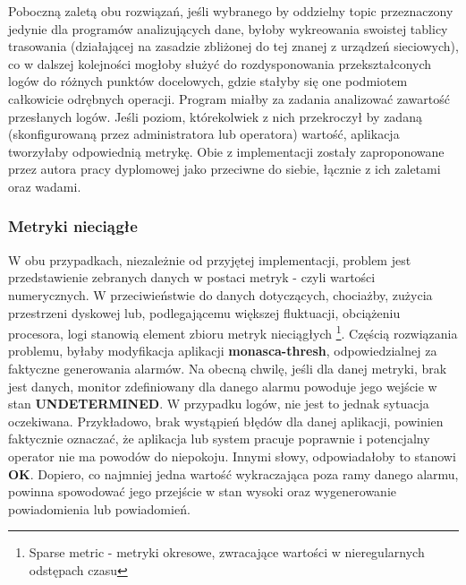     Poboczną zaletą obu rozwiązań, jeśli wybranego by oddzielny topic przeznaczony jedynie dla programów analizujących dane, byłoby wykreowania
    swoistej tablicy trasowania (działającej na zasadzie zbliżonej do tej znanej z urządzeń sieciowych), co w dalszej kolejności mogłoby
    służyć do rozdysponowania przekształconych logów do różnych punktów docelowych, gdzie stałyby się one podmiotem całkowicie odrębnych operacji.
    Program miałby za zadania analizować zawartość przesłanych logów. Jeśli poziom, którekolwiek z nich przekroczył by zadaną (skonfigurowaną przez
    administratora lub operatora) wartość, aplikacja tworzyłaby odpowiednią metrykę.
    Obie z implementacji zostały zaproponowane przez autora pracy dyplomowej jako przeciwne do siebie, łącznie z ich zaletami oraz wadami.

    \subsubsection{Metryki nieciągłe}
    W obu przypadkach, niezależnie od przyjętej implementacji, problem jest przedstawienie zebranych danych w postaci metryk - czyli wartości
    numerycznych. W przeciwieństwie do danych dotyczących, chociażby, zużycia przestrzeni dyskowej lub, podlegającemu większej
    fluktuacji, obciążeniu procesora, logi stanowią element zbioru metryk nieciągłych \footnote{Sparse metric - metryki okresowe,
    zwracające wartości w nieregularnych odstępach czasu}. Częścią rozwiązania problemu, byłaby modyfikacja aplikacji \textbf{monasca-thresh},
    odpowiedzialnej za faktyczne generowania alarmów. Na obecną chwilę, jeśli dla danej metryki, brak jest danych, monitor zdefiniowany
    dla danego alarmu powoduje jego wejście w stan \textbf{UNDETERMINED}. W przypadku logów, nie jest to jednak sytuacja oczekiwana. 
    Przykładowo, brak wystąpień błędów dla danej aplikacji, powinien faktycznie oznaczać, że aplikacja lub system pracuje poprawnie i
    potencjalny operator nie ma powodów do niepokoju. Innymi słowy, odpowiadałoby to stanowi \textbf{OK}. Dopiero, co najmniej jedna wartość
    wykraczająca poza ramy danego alarmu, powinna spowodować jego przejście w stan wysoki oraz wygenerowanie powiadomienia lub powiadomień.
